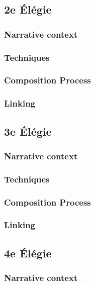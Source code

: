 \documentclass[12pt,twoside,maitrise]{dms}
\theoremstyle{definition}
\begin{document}
\subsection{2e Élégie}

\subsubsection{Narrative context}

\subsubsection{Techniques}

\subsubsection{Composition Process}

\subsubsection{Linking}

\subsection{3e Élégie}

\subsubsection{Narrative context}

\subsubsection{Techniques}

\subsubsection{Composition Process}

\subsubsection{Linking}

\subsection{4e Élégie}

\subsubsection{Narrative context}
\end{document}

